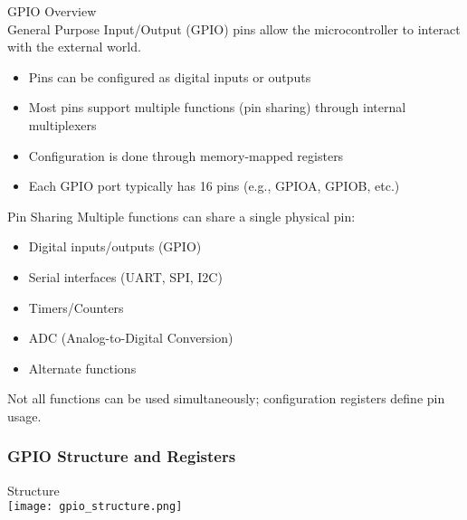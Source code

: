 \begin{minipage}{0.55\linewidth}
\begin{concept}{GPIO Overview}\\
General Purpose Input/Output (GPIO) pins allow the microcontroller to interact with the external world.
\begin{itemize}
    \item Pins can be configured as digital inputs or outputs
    \item Most pins support multiple functions (pin sharing) through internal multiplexers
    \item Configuration is done through memory-mapped registers
    \item Each GPIO port typically has 16 pins (e.g., GPIOA, GPIOB, etc.)
\end{itemize}
\end{concept}
\end{minipage}
\begin{minipage}{0.45\linewidth}
\begin{theorem}{Pin Sharing}
Multiple functions can share a single physical pin:
\begin{itemize}
    \item Digital inputs/outputs (GPIO)
    \item Serial interfaces (UART, SPI, I2C)
    \item Timers/Counters
    \item ADC (Analog-to-Digital Conversion)
    \item Alternate functions
\end{itemize}
Not all functions can be used simultaneously; configuration registers define pin usage.
\end{theorem}
\end{minipage}

\subsubsection{GPIO Structure and Registers}

\begin{concept}{Structure}\\
   \texttt{[image: gpio\_structure.png]}
\end{concept}


